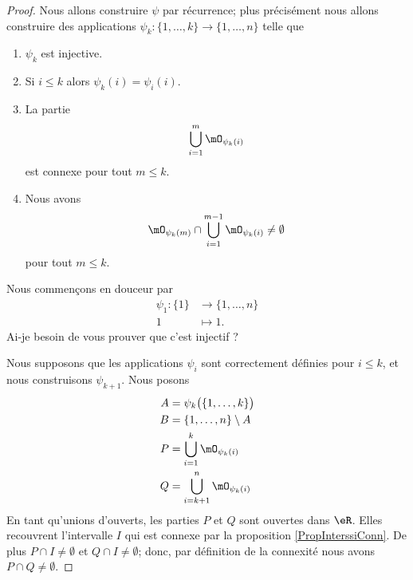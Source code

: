 \begin{proof}
    Nous allons construire \( \psi\) par récurrence; plus précisément nous allons construire des applications \( \psi_k\colon \{ 1,\ldots, k \}\to \{ 1,\ldots, n \}\) telle que
    \begin{enumerate}
        \item
            \( \psi_k\) est injective.
        \item
            Si \( i\leq k\) alors \( \psi_k(i)=\psi_i(i)\).
        \item
            La partie
            \begin{equation}        \label{EQooAMAGooDHHvGR}
            \bigcup_{i=1}^m\mO_{\psi_k(i)}
            \end{equation}
            est connexe pour tout \( m\leq k\).
        \item
            Nous avons
            \begin{equation}        \label{EQooOOZUooKVlDPi}
             \mO_{\psi_k(m)}\cap\bigcup_{i=1}^{m-1}\mO_{\psi_k(i)}\neq \emptyset
            \end{equation}
             pour tout \( m\leq k\).
    \end{enumerate}

    Nous commençons en douceur par
    \begin{equation}
        \begin{aligned}
            \psi_1\colon \{ 1 \}&\to \{ 1,\ldots, n \} \\
            1&\mapsto 1. 
        \end{aligned}
    \end{equation}
    Ai-je besoin de vous prouver que c'est injectif ?

    Nous supposons que les applications \( \psi_i\) sont correctement définies pour \( i\leq k\), et nous construisons \( \psi_{k+1}\). Nous posons
    \begin{subequations}
        \begin{align}
            A&=\psi_k\big( \{ 1,\ldots, k \} \big)\\
            B&=\{ 1,\ldots, n \}\setminus A\\
            P&=\bigcup_{i=1}^k\mO_{\psi_k(i)}\\
            Q&=\bigcup_{i=k+1}^n\mO_{\psi_k(i)}
        \end{align}
    \end{subequations}
    En tant qu'unions d'ouverts, les parties \( P\) et \( Q\) sont ouvertes dans \( \eR\). Elles recouvrent l'intervalle \( I\) qui est connexe par la proposition \ref{PropInterssiConn}. De plus \( P\cap I\neq \emptyset\) et \( Q\cap I\neq \emptyset\); donc, par définition de la connexité nous avons \( P\cap Q\neq\emptyset\).


\end{proof}

